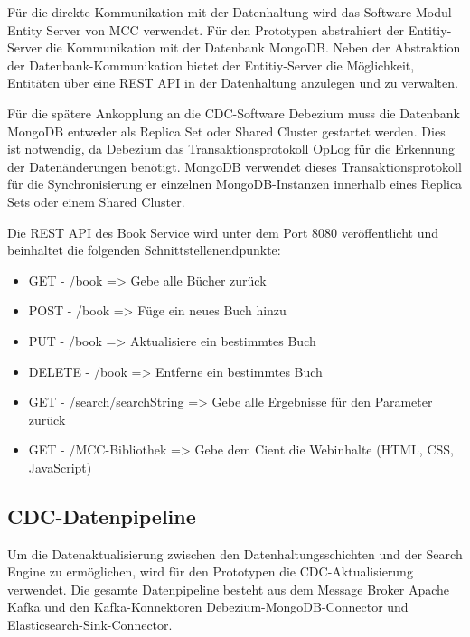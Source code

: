 Für die direkte Kommunikation mit der Datenhaltung wird das Software-Modul \glqq Entity Server\grqq{} von MCC verwendet. Für den Prototypen abstrahiert der Entitiy-Server die Kommunikation mit der Datenbank MongoDB. Neben der Abstraktion der Datenbank-Kommunikation bietet der Entitiy-Server die Möglichkeit, Entitäten über eine REST API in der Datenhaltung anzulegen und zu verwalten.

Für die spätere Ankopplung an die CDC-Software Debezium muss die Datenbank MongoDB entweder als \glqq Replica Set\grqq{} oder \glqq Shared Cluster\grqq{} gestartet werden. Dies ist notwendig, da Debezium das Transaktionsprotokoll \glqq OpLog\grqq{} für die Erkennung der Datenänderungen benötigt. MongoDB verwendet dieses Transaktionsprotokoll für die Synchronisierung er einzelnen MongoDB-Instanzen innerhalb eines Replica Sets oder einem Shared Cluster.

Die REST API des Book Service wird unter dem Port 8080 veröffentlicht und beinhaltet die folgenden Schnittstellenendpunkte:

\begin{itemize}
    \item GET - \glqq /book\grqq{} => Gebe alle Bücher zurück
    \item POST - \glqq /book\grqq{} => Füge ein neues Buch hinzu
    \item PUT - \glqq /book\grqq{} => Aktualisiere ein bestimmtes Buch
    \item DELETE - \glqq /book\grqq{} => Entferne ein bestimmtes Buch
    \item GET - \glqq /search/{searchString}\grqq{} => Gebe alle Ergebnisse für den Parameter zurück
    \item GET - \glqq /MCC-Bibliothek\grqq{} => Gebe dem Cient die Webinhalte (HTML, CSS, JavaScript)
\end{itemize}

\subsection{CDC-Datenpipeline\label{sec5.2.2:Unterunterpunkt-2}}

Um die Datenaktualisierung zwischen den Datenhaltungsschichten und der Search Engine zu ermöglichen, wird für den Prototypen die CDC-Aktualisierung verwendet. Die gesamte Datenpipeline besteht aus dem Message Broker \glqq Apache Kafka\grqq{} und den Kafka-Konnektoren \glqq Debezium-MongoDB-Connector\grqq{} und \glqq Elasticsearch-Sink-Connector\grqq{}.

